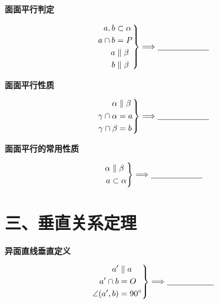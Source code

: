 \documentclass{exam-zh}
\begin{document}
\begin{question}[points=5]
  \textbf{面面平行判定}\par
\[
\left.
\begin{aligned}
a,b&\subset\alpha\\
a\cap b&=P\\
a&\parallel\beta\\
b&\parallel\beta
\end{aligned}
\right\}
\Longrightarrow
\underline{\hspace{22mm}}
\]


\end{question}



\begin{question}[points=5]
  \textbf{面面平行性质}\par
\[
\left.
\begin{aligned}
\alpha&\parallel\beta\\
\gamma\cap\alpha&=a\\
\gamma\cap\beta&=b
\end{aligned}
\right\}
\Longrightarrow
\underline{\hspace{22mm}}
\]


\end{question}



\begin{question}[points=5]
  \textbf{面面平行的常用性质}\par
\[
\left.
\begin{aligned}
\alpha&\parallel\beta\\
a&\subset\alpha
\end{aligned}
\right\}
\Longrightarrow
\underline{\hspace{22mm}}
\]


\end{question}


\section*{三、垂直关系定理}


\begin{question}[points=5]
  \textbf{异面直线垂直定义}\par
\[
\left.
\begin{aligned}
a'&\parallel a\\
a'\cap b&=O\\
\angle(a',b)&=90^\circ
\end{aligned}
\right\}
\Longrightarrow
\underline{\hspace{20mm}}
\]


\end{question}
\end{document}
